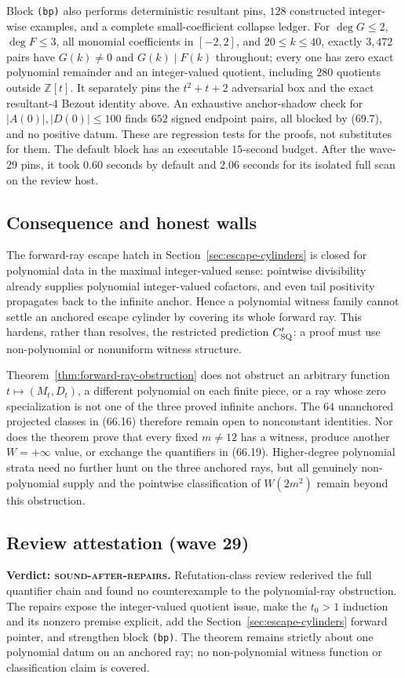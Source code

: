 \documentclass[10pt,reqno]{amsart}
\theoremstyle{definition}
\newcommand{\1}{\mathbf 1}
\begin{document}
Block \texttt{(bp)} also performs deterministic resultant pins, $128$
constructed integer-wise examples, and a complete small-coefficient collapse
ledger.  For $\deg G\leq2$, $\deg F\leq3$, all monomial coefficients in
$[-2,2]$, and $20\leq k\leq40$, exactly $3{,}472$ pairs have $G(k)\ne0$ and
$G(k)\mid F(k)$ throughout; every one has zero exact polynomial remainder
and an integer-valued quotient, including $280$ quotients outside
$\mathbb Z[t]$.  It separately pins the $t^2+t+2$ adversarial box and the
exact resultant-$4$ Bezout identity above.  An exhaustive anchor-shadow
check for $|A(0)|,|D(0)|\leq100$ finds $652$ signed endpoint pairs, all
blocked by (69.7), and no positive datum.  These are regression tests for the
proofs, not substitutes for them.  The default block has an executable
$15$-second budget.  After the wave-29 pins, it took $0.60$ seconds by
default and $2.06$ seconds for its isolated full scan on the review host.

\subsection{Consequence and honest walls}
The forward-ray escape hatch in Section~\ref{sec:escape-cylinders} is closed
for polynomial data in the maximal integer-valued sense: pointwise
divisibility already supplies polynomial integer-valued cofactors, and even
tail positivity propagates back to the infinite anchor.  Hence a polynomial
witness family cannot settle an anchored escape cylinder by covering its
whole forward ray.  This hardens, rather than resolves, the restricted
prediction $C_{\rm SQ}'$: a proof must use non-polynomial or nonuniform
witness structure.

Theorem~\ref{thm:forward-ray-obstruction} does not obstruct an arbitrary
function $t\mapsto(M_t,D_t)$, a different polynomial on each finite piece,
or a ray whose zero specialization is not one of the three proved infinite
anchors.  The $64$ unanchored projected classes in (66.16) therefore remain
open to nonconstant identities.  Nor does the theorem prove that every fixed
$m\ne12$ has a witness, produce another $W=+\infty$ value, or exchange the
quantifiers in (66.19).  Higher-degree polynomial strata need no further
hunt on the three anchored rays, but all genuinely non-polynomial supply and
the pointwise classification of $W(2m^2)$ remain beyond this obstruction.

\subsection{Review attestation (wave 29)}
\medskip\noindent\textbf{Verdict: \textsc{sound-after-repairs}.}
Refutation-class review rederived the full quantifier chain and found no
counterexample to the polynomial-ray obstruction.  The repairs expose the
integer-valued quotient issue, make the $t_0>1$ induction and its nonzero
premise explicit, add the Section~\ref{sec:escape-cylinders} forward pointer,
and strengthen block \texttt{(bp)}.  The theorem remains strictly about one
polynomial datum on an anchored ray; no non-polynomial witness function or
classification claim is covered.
\end{document}
